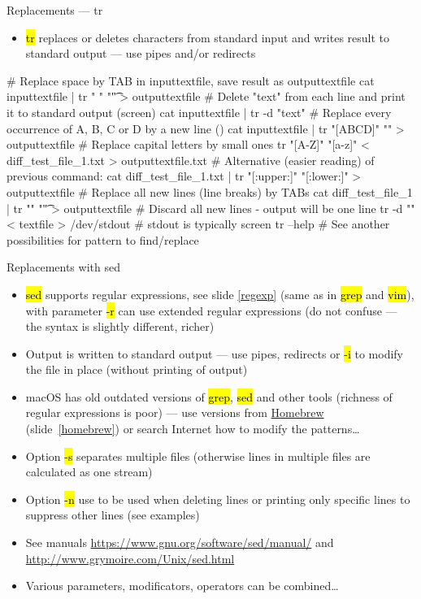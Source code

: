 \documentclass[compress, ucs, xelatex, 11pt, xcolor=svgnames,
  hyperref={
    bookmarks=true,
    unicode=true,
    colorlinks=true,
    pdftitle={Linux, command line and MetaCentrum},
    plainpages=false,
    pdfauthor={Vojtech Zeisek},
    pdfsubject={Course about use of Linux command line, writing shell scripts and using MetaCentrum of CESNET},
    pdfcreator={XeLaTeX},
    pdfkeywords={Linux, GNU, BASH, shell, command line, MetaCentrum},
    linkcolor=DarkRed,
    anchorcolor=DarkBlue,
    citecolor=Indigo,
    filecolor=NavyBlue,
    menucolor=DarkMagenta,
    urlcolor=DarkBlue,
    pdftex},
  url={hyphens, lowtilde} %
  ]{beamer}
\renewcommand{\texttt}[1]{\hl{\ttfamily #1}}
\begin{document}
\begin{frame}[fragile]{Replacements --- tr}
  \begin{itemize}
    \item \texttt{tr} replaces or deletes characters from standard input and writes result to standard output --- use pipes and/or redirects
  \end{itemize}
  \begin{bashcode}
    # Replace space by TAB in inputtextfile, save result as outputtextfile
    cat inputtextfile | tr " " "\t" > outputtextfile
    # Delete "text" from each line and print it to standard output (screen)
    cat inputtextfile | tr -d "text"
    # Replace every occurrence of A, B, C or D by a new line (\n)
    cat inputtextfile | tr "[ABCD]" "\n" > outputtextfile
    # Replace capital letters by small ones
    tr "[A-Z]" "[a-z]" < diff_test_file_1.txt > outputtextfile.txt
    # Alternative (easier reading) of previous command:
    cat diff_test_file_1.txt | tr "[:upper:]" "[:lower:]" > outputtextfile
    # Replace all new lines (line breaks) by TABs
    cat diff_test_file_1 | tr "\n" "\t"  > outputtextfile
    # Discard all new lines - output will be one line
    tr -d "\n" < textfile > /dev/stdout # stdout is typically screen
    tr --help # See another possibilities for pattern to find/replace
  \end{bashcode}
\end{frame}

\begin{frame}{Replacements with sed}
  \begin{itemize}
    \item \texttt{sed} supports regular expressions, see slide \ref{regexp} (same as in \texttt{grep} and \texttt{vim}), with parameter \texttt{-r} can use extended regular expressions (do not confuse --- the syntax is slightly different, richer)
    \item Output is written to standard output --- use pipes, redirects or \texttt{-i} to modify the file in place (without printing of output)
    \item macOS has old outdated versions of \texttt{grep}, \texttt{sed} and other tools (richness of regular expressions is poor) --- use versions from \href{http://brew.sh/}{Homebrew} (slide~\ref{homebrew}) or search Internet how to modify the patterns\ldots
    \item Option \texttt{-s} separates multiple files (otherwise lines in multiple files are calculated as one stream)
    \item Option \texttt{-n} use to be used when deleting lines or printing only specific lines to suppress other lines (see examples)
    \item See manuals \url{https://www.gnu.org/software/sed/manual/} and \url{http://www.grymoire.com/Unix/sed.html}
    \item Various parameters, modificators, operators can be combined\ldots
  \end{itemize}
\end{frame}
\end{document}
